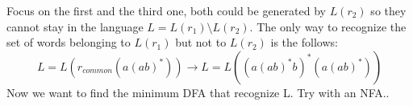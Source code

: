 Focus on the first and the third one, both could be generated by $L(r_2)$ so they cannot stay in the language $L = L(r_1) \setminus L(r_2)$.
\newline
The only way to recognize the set of words belonging to $L(r_1)$ but not to $L(r_2)$ is the follows:
\begin{equation}
L = L(r_{common}(a(ab)^*)) \rightarrow L = L((a(ab)^*b)^*(a(ab)^*))
\end{equation}
Now we want to find the minimum DFA that recognize L.
Try with an NFA..





















